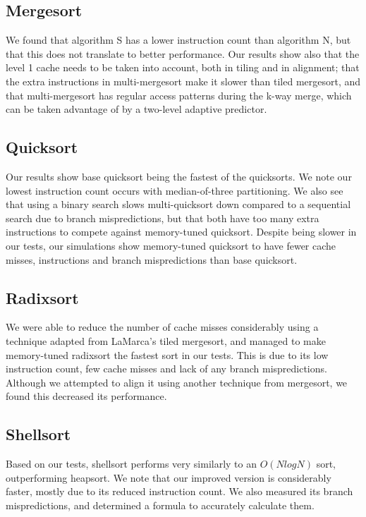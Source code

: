 \subsection{Mergesort}

We found that algorithm S has a lower instruction count than algorithm N, but
that this does not translate to better performance. Our results show also that
the level 1 cache needs to be taken into account, both in tiling and in
alignment; that the extra instructions in multi-mergesort make it slower than
tiled mergesort, and that multi-mergesort has regular access patterns during the
k-way merge, which can be taken advantage of by a two-level adaptive predictor.


\subsection{Quicksort}

Our results show base quicksort being the fastest of the quicksorts. We note our
lowest instruction count occurs with median-of-three partitioning. We also see
that using a binary search slows multi-quicksort down compared to a sequential
search due to branch mispredictions, but that both have too many extra
instructions to compete against memory-tuned quicksort. Despite being slower in
our tests, our simulations show memory-tuned quicksort to have fewer cache
misses, instructions and branch mispredictions than base quicksort.


\subsection{Radixsort}

We were able to reduce the number of cache misses considerably using a technique
adapted from LaMarca's tiled mergesort, and managed to make memory-tuned radixsort the
fastest sort in our tests. This is due to its low instruction count, few cache
misses and lack of any branch mispredictions. Although we attempted to align it
using another technique from mergesort, we found this decreased its performance.


\subsection{Shellsort}

Based on our tests, shellsort performs very similarly to an $O(NlogN)$ sort,
outperforming heapsort. We note that our improved version is considerably
faster, mostly due to its reduced instruction count. We also measured its branch
mispredictions, and determined a formula to accurately calculate them.

